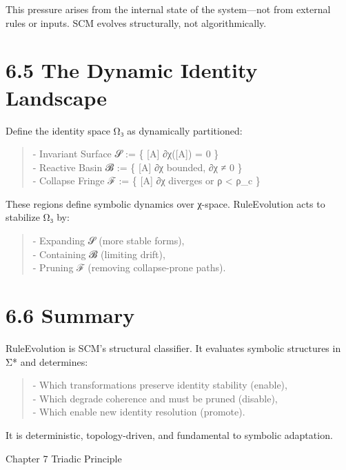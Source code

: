 This pressure arises from the internal state of the system---not from
external rules or inputs. SCM evolves structurally, not algorithmically.

\section{6.5 \textbar{} The Dynamic Identity
Landscape}\label{the-dynamic-identity-landscape}

Define the identity space Ω₃ as dynamically partitioned:

\begin{quote}
- Invariant Surface 𝓢 := \{ {[}A{]} \textbar{} ∂χ({[}A{]}) = 0 \}\\
- Reactive Basin 𝓑 := \{ {[}A{]} \textbar{} ∂χ bounded, ∂χ ≠ 0 \}\\
- Collapse Fringe ℱ := \{ {[}A{]} \textbar{} ∂χ diverges or ρ
\textless{} ρ\_c \}
\end{quote}

These regions define symbolic dynamics over χ-space. RuleEvolution acts
to stabilize Ω₃ by:

\begin{quote}
- Expanding 𝓢 (more stable forms),\\
- Containing 𝓑 (limiting drift),\\
- Pruning ℱ (removing collapse-prone paths).
\end{quote}

\section{6.6 \textbar{} Summary}\label{summary-4}

RuleEvolution is SCM's structural classifier. It evaluates symbolic
structures in Σ* and determines:

\begin{quote}
- Which transformations preserve identity stability (enable),\\
- Which degrade coherence and must be pruned (disable),\\
- Which enable new identity resolution (promote).
\end{quote}

It is deterministic, topology-driven, and fundamental to symbolic
adaptation.

Chapter 7 \textbar{} Triadic Principle

